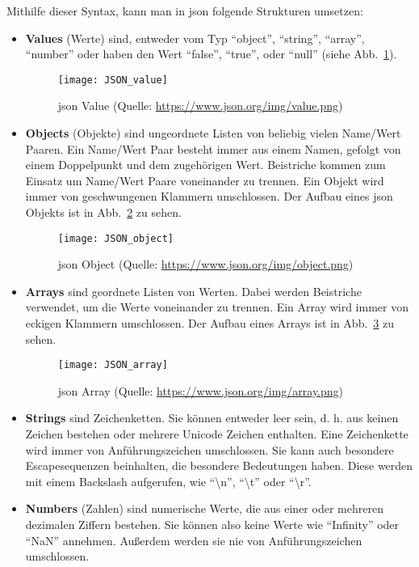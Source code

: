 Mithilfe dieser Syntax, kann man in \ac{json} folgende Strukturen umsetzen:
\begin{itemize}
	\item \textbf{Values} (\dt Werte) sind, entweder vom Typ \enquote{object}, \enquote{string}, \enquote{array}, \enquote{number} oder haben den Wert \enquote{false}, \enquote{true}, oder \enquote{null} (siehe Abb.~\ref{fig:json_value}).
	\begin{figure}[H]
		\centering
		\texttt{[image: JSON\_value]}
		\caption{\ac{json} Value (Quelle: \url{https://www.json.org/img/value.png})  \label{fig:json_value}}
	\end{figure}
	
	\item \textbf{Objects} (\dt Objekte) sind ungeordnete Listen von beliebig vielen Name/Wert Paaren. Ein Name/Wert Paar besteht immer aus einem Namen, gefolgt von einem Doppelpunkt und dem zugehörigen Wert. Beistriche kommen zum Einsatz um Name/Wert Paare voneinander zu trennen. Ein Objekt wird immer von geschwungenen Klammern umschlossen. Der Aufbau eines \ac{json} Objekts ist in Abb.~\ref{fig:json_object} zu sehen.
	
	\begin{figure}[H]
		\centering
		\texttt{[image: JSON\_object]}
		\caption{\ac{json} Object (Quelle: \url{https://www.json.org/img/object.png})  \label{fig:json_object}}
	\end{figure}
	
	\item \textbf{Arrays} sind geordnete Listen von Werten. Dabei werden Beistriche verwendet, um die Werte voneinander zu trennen. Ein Array wird immer von eckigen Klammern umschlossen. Der Aufbau eines Arrays ist in Abb.~\ref{fig:json_array} zu sehen.
	
	\begin{figure}[H]
		\centering
		\texttt{[image: JSON\_array]}
		\caption{\ac{json} Array (Quelle: \url{https://www.json.org/img/array.png})  \label{fig:json_array}}
	\end{figure}
	
	\item \textbf{Strings} sind Zeichenketten. Sie können entweder leer sein, d. h. aus keinen Zeichen bestehen oder mehrere Unicode Zeichen enthalten. Eine Zeichenkette wird immer von Anführungszeichen umschlossen. Sie kann auch besondere Escapesequenzen beinhalten, die besondere Bedeutungen haben. Diese werden mit einem Backslash aufgerufen, wie \zB \enquote{\textbackslash n}, \enquote{\textbackslash t} oder \enquote{\textbackslash r}.
	
	\item \textbf{Numbers} (\dt Zahlen) sind numerische Werte, die aus einer oder mehreren dezimalen Ziffern bestehen. Sie können also keine Werte wie \zB \enquote{Infinity} oder \enquote{NaN} annehmen. Außerdem werden sie nie von Anführungszeichen umschlossen. 
	
\end{itemize}

